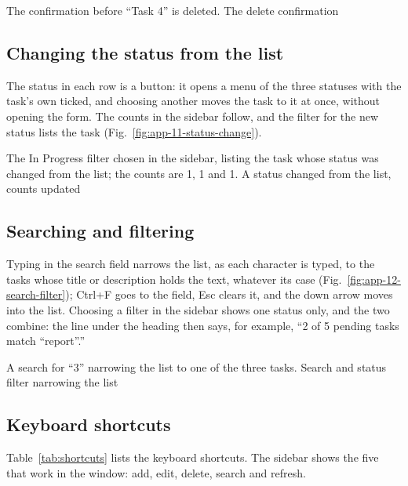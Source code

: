   {The confirmation before ``Task 4'' is deleted.}
  {The delete confirmation}

\subsection{Changing the status from the list}

The status in each row is a button: it opens a menu of the three statuses with the task's own ticked, and choosing
another moves the task to it at once, without opening the form. The counts in the sidebar follow, and the filter for
the new status lists the task (Fig.~\ref{fig:app-11-status-change}).

  {The In Progress filter chosen in the sidebar, listing the task whose status was changed from the list; the counts
   are 1, 1 and 1.}
  {A status changed from the list, counts updated}

\subsection{Searching and filtering}

Typing in the search field narrows the list, as each character is typed, to the tasks whose title or description
holds the text, whatever its case (Fig.~\ref{fig:app-12-search-filter}); Ctrl+F goes to the field, Esc clears it, and
the down arrow moves into the list. Choosing a filter in the sidebar shows
one status only, and the two combine: the line under the heading then says, for example, ``2 of 5 pending tasks
match “report”.''

  {A search for ``3'' narrowing the list to one of the three tasks.}
  {Search and status filter narrowing the list}

\subsection{Keyboard shortcuts}

Table~\ref{tab:shortcuts} lists the keyboard shortcuts. The sidebar shows the five that work in the window: add,
edit, delete, search and refresh.

